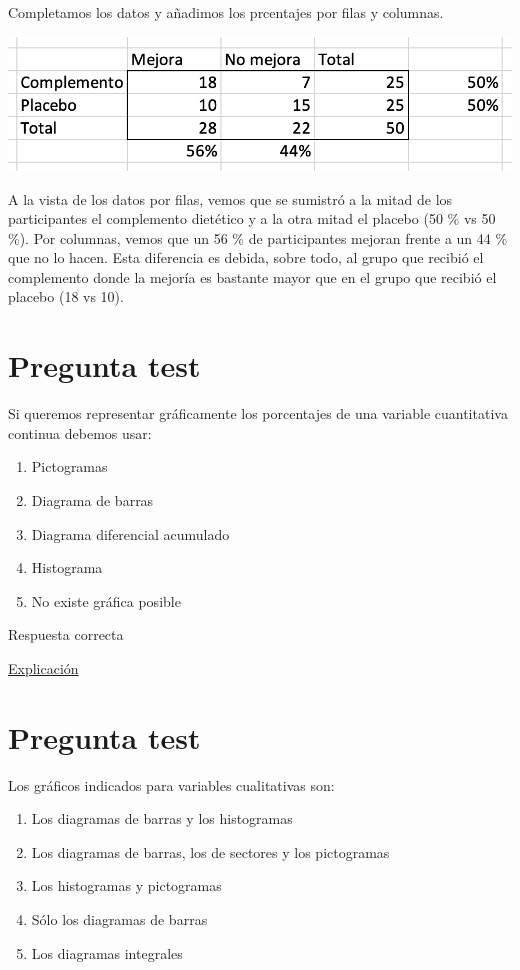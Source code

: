 \documentclass[
]{book}
\providecommand{\tightlist}{%
  \setlength{\itemsep}{0pt}\setlength{\parskip}{0pt}}
\begin{document}
Completamos los datos y añadimos los prcentajes por filas y columnas.

\includegraphics[width=13.44in]{img/2_5}

A la vista de los datos por filas, vemos que se sumistró a la mitad de los participantes el complemento dietético y a la otra mitad el placebo (50 \% vs 50 \%). Por columnas, vemos que un 56 \% de participantes mejoran frente a un 44 \% que no lo hacen. Esta diferencia es debida, sobre todo, al grupo que recibió el complemento donde la mejoría es bastante mayor que en el grupo que recibió el placebo (18 vs 10).

\hypertarget{pregunta-test-59}{%
\section{Pregunta test}\label{pregunta-test-59}}

Si queremos representar gráficamente los porcentajes de una variable cuantitativa continua debemos usar:

\begin{enumerate}
\def\labelenumi{\alph{enumi})}
\tightlist
\item
  Pictogramas
\item
  Diagrama de barras
\item
  Diagrama diferencial acumulado
\item
  Histograma
\item
  No existe gráfica posible
\end{enumerate}

Respuesta correcta

\href{https://1fjmanzano.github.io/bioestadistica/histogramas.html}{Explicación}

\hypertarget{pregunta-test-60}{%
\section{Pregunta test}\label{pregunta-test-60}}

Los gráficos indicados para variables cualitativas son:

\begin{enumerate}
\def\labelenumi{\alph{enumi})}
\tightlist
\item
  Los diagramas de barras y los histogramas
\item
  Los diagramas de barras, los de sectores y los pictogramas
\item
  Los histogramas y pictogramas
\item
  Sólo los diagramas de barras
\item
  Los diagramas integrales
\end{enumerate}
\end{document}
